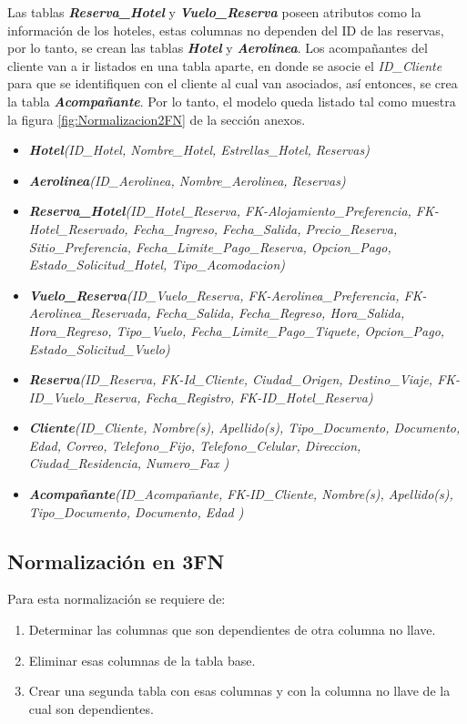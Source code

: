 \documentclass{article}
\begin{document}
Las tablas \textit{\textbf{Reserva\_Hotel}} y  \textbf{\textit{Vuelo\_Reserva}} poseen atributos como la información de los hoteles, estas columnas no dependen del ID de las reservas, por lo tanto, se crean las tablas \textit{\textbf{Hotel}} y \textbf{\textit{Aerolinea}}. Los acompañantes del cliente van a ir listados en una tabla aparte, en donde se asocie el \textit{ID\_Cliente} para que se identifiquen con el cliente al cual van asociados, así entonces, se crea la tabla \textit{\textbf{Acompañante}}. Por lo tanto, el modelo queda listado tal como muestra la figura \ref{fig:Normalizacion2FN} de la sección anexos.
\begin{itemize}
    \item \textit{\textbf{Hotel}(ID\_Hotel, Nombre\_Hotel, Estrellas\_Hotel, Reservas)}
    \item \textit{\textbf{Aerolinea}(ID\_Aerolinea, Nombre\_Aerolinea, Reservas)}
    \item \textit{\textbf{Reserva\_Hotel}(ID\_Hotel\_Reserva, FK-Alojamiento\_Preferencia, FK-Hotel\_Reservado, Fecha\_Ingreso, Fecha\_Salida, Precio\_Reserva, Sitio\_Preferencia, Fecha\_Limite\_Pago\_Reserva, Opcion\_Pago, Estado\_Solicitud\_Hotel, Tipo\_Acomodacion)}
    \item \textit{\textbf{Vuelo\_Reserva}(ID\_Vuelo\_Reserva, FK-Aerolinea\_Preferencia, FK-Aerolinea\_Reservada, Fecha\_Salida, Fecha\_Regreso, Hora\_Salida, Hora\_Regreso, Tipo\_Vuelo, Fecha\_Limite\_Pago\_Tiquete, Opcion\_Pago, Estado\_Solicitud\_Vuelo)}
    \item \textit{\textbf{Reserva}(ID\_Reserva, FK-Id\_Cliente, Ciudad\_Origen, Destino\_Viaje, FK-ID\_Vuelo\_Reserva, Fecha\_Registro, FK-ID\_Hotel\_Reserva)}
    \item \textit{\textbf{Cliente}(ID\_Cliente, Nombre(s), Apellido(s), Tipo\_Documento, Documento, Edad, Correo, Telefono\_Fijo, Telefono\_Celular, Direccion, Ciudad\_Residencia, Numero\_Fax )}
    \item \textit{\textbf{Acompañante}(ID\_Acompañante, FK-ID\_Cliente, Nombre(s), Apellido(s), Tipo\_Documento, Documento, Edad )}
\end{itemize}


\subsection{Normalización en 3FN}

Para esta normalización se requiere de:
\begin{enumerate}
    \item Determinar las columnas que son dependientes de otra columna no llave.
    \item Eliminar esas columnas de la tabla base.
    \item Crear una segunda tabla con esas columnas y con la columna no llave de la cual son dependientes.
\end{enumerate}
\end{document}
